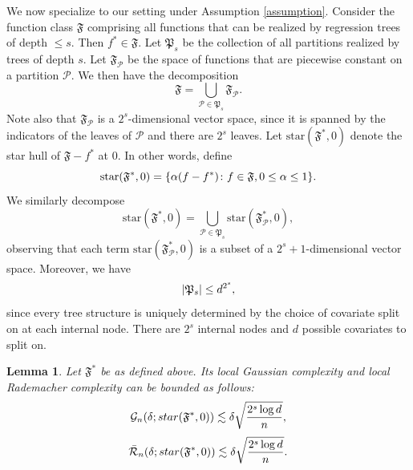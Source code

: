 \documentclass[11pt]{article}
\newtheorem{lemma}[theorem]{Lemma}
\DeclarePairedDelimiter{\braces}{\lbrace}{\rbrace}
\DeclarePairedDelimiter{\abs}{|}{|}
\newcommand{\partition}{\mathcal{P}}
\newcommand{\partitionspace}[1][\sparsity]{\mathfrak{P}_{#1}}
\newcommand{\sparsity}{s}
\newcommand{\funcclass}{\mathfrak{F}}
\begin{document}
We now specialize to our setting under Assumption \ref{assumption}.
Consider the function class $\funcclass$ comprising all functions that can be realized by regression trees of depth $\leq s$.
Then $f^* \in \funcclass$.
Let $\partitionspace$ be the collection of all partitions realized by trees of depth $s$.
Let $\funcclass_\partition$ be the space of functions that are piecewise constant on a partition $\partition$.
We then have the decomposition
\begin{equation}
    \funcclass = \bigcup_{\partition \in \partitionspace} \funcclass_{\partition}.
\end{equation}
Note also that $\funcclass_\partition$ is a $2^s$-dimensional vector space, since it is spanned by the indicators of the leaves of $\partition$ and there are $2^s$ leaves.
Let $\text{star}(\funcclass^*,0)$ denote the star hull of $\funcclass - f^*$ at 0.
In other words, define
\begin{equation}
    \text{star}(\funcclass^*,0) = \braces*{\alpha(f-f^*) \colon f \in \funcclass, 0 \leq \alpha \leq 1}.
\end{equation}
We similarly decompose
\begin{equation}
    \text{star}(\funcclass^*,0) = \bigcup_{\partition \in \partitionspace} \text{star}(\funcclass_{\partition}^*,0),
\end{equation}
observing that each term $\text{star}(\funcclass_{\partition}^*,0)$ is a subset of a $2^s + 1$-dimensional vector space.
Moreover, we have
\begin{equation}
    \abs*{\partitionspace} \leq d^{2^s},
\end{equation}
since every tree structure is uniquely determined by the choice of covariate split on at each internal node.
There are $2^s$ internal nodes and $d$ possible covariates to split on.

\begin{lemma}
\label{lem:local_complexity_treefuncs}
    Let $\funcclass^*$ be as defined above.
    Its local Gaussian complexity and local Rademacher complexity can be bounded as follows:
    \begin{equation} \label{eq:local_gaussian_complexity_treefuncs}
        \mathcal{G}_n(\delta;\textnormal{star}(\funcclass^*,0)) \lesssim \delta\sqrt{\frac{2^s\log d}{n}},
    \end{equation}
    \begin{equation} \label{eq:local_Rademacher_complexity_treefuncs}
        \bar{\mathcal{R}}_n(\delta;\textnormal{star}(\funcclass^*,0)) \lesssim \delta\sqrt{\frac{2^s\log d}{n}}.
    \end{equation}
\end{lemma}
\end{document}
